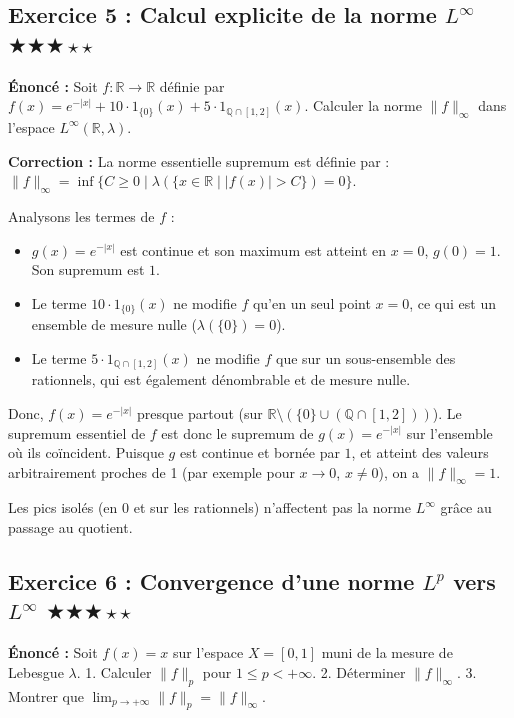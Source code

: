 \documentclass[11pt,a4paper]{article}
\begin{document}
\subsection*{Exercice 5 : Calcul explicite de la norme $L^\infty$ \quad $\bigstar\bigstar\bigstar\star\star$}

\textbf{Énoncé :}
Soit $f : \mathbb{R} \to \mathbb{R}$ définie par $f(x) = e^{-|x|} + 10 \cdot 1_{\{0\}}(x) + 5 \cdot 1_{\mathbb{Q} \cap [1, 2]}(x)$.
Calculer la norme $\|f\|_\infty$ dans l'espace $L^\infty(\mathbb{R}, \lambda)$.

\textbf{Correction :}
La norme essentielle supremum est définie par :
$\|f\|_\infty = \inf \{ C \ge 0 \mid \lambda(\{x \in \mathbb{R} \mid |f(x)| > C\}) = 0 \}$.

Analysons les termes de $f$ :
\begin{itemize}\item $g(x) = e^{-|x|}$ est continue et son maximum est atteint en $x=0$, $g(0) = 1$. Son supremum est $1$.
\item Le terme $10 \cdot 1_{\{0\}}(x)$ ne modifie $f$ qu'en un seul point $x=0$, ce qui est un ensemble de mesure nulle ($\lambda(\{0\}) = 0$).
\item Le terme $5 \cdot 1_{\mathbb{Q} \cap [1, 2]}(x)$ ne modifie $f$ que sur un sous-ensemble des rationnels, qui est également dénombrable et de mesure nulle.\end{itemize}

Donc, $f(x) = e^{-|x|}$ presque partout (sur $\mathbb{R} \setminus ( \{0\} \cup (\mathbb{Q} \cap [1,2]) )$).
Le supremum essentiel de $f$ est donc le supremum de $g(x) = e^{-|x|}$ sur l'ensemble où ils coïncident.
Puisque $g$ est continue et bornée par $1$, et atteint des valeurs arbitrairement proches de 1 (par exemple pour $x \to 0$, $x \neq 0$), on a $\|f\|_\infty = 1$.

Les pics isolés (en 0 et sur les rationnels) n'affectent pas la norme $L^\infty$ grâce au passage au quotient.


\subsection*{Exercice 6 : Convergence d'une norme $L^p$ vers $L^\infty$ \quad $\bigstar\bigstar\bigstar\star\star$}

\textbf{Énoncé :}
Soit $f(x) = x$ sur l'espace $X = [0, 1]$ muni de la mesure de Lebesgue $\lambda$.
1. Calculer $\|f\|_p$ pour $1 \le p < +\infty$.
2. Déterminer $\|f\|_\infty$.
3. Montrer que $\lim_{p \to +\infty} \|f\|_p = \|f\|_\infty$.
\end{document}
